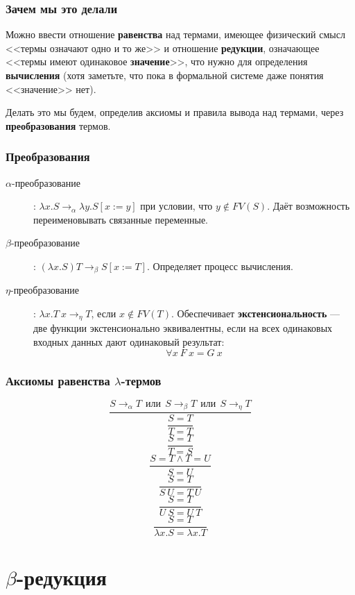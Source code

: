 \documentclass{../../slides-style}
\begin{document}
    \begin{frame}
        \frametitle{Зачем мы это делали}
        Можно ввести отношение \textbf{равенства} над термами, имеющее физический смысл 
        <<термы означают одно и то же>> и отношение \textbf{редукции}, означающее <<термы имеют 
        одинаковое \textbf{значение}>>, что нужно для определения \textbf{вычисления} (хотя заметьте, что пока в
        формальной системе даже понятия <<значение>> нет).
        
        Делать это мы будем, определив аксиомы и правила вывода над термами, через \textbf{преобразования}
        термов.
    \end{frame}
        
    \begin{frame}
        \frametitle{Преобразования}
        \begin{description}
            \item [$\alpha$-преобразование]: $\lambda x.S \rightarrow_\alpha 
                    \lambda y.S[x := y]$ при условии, что $y \notin FV(S)$. 
                    Даёт возможность переименовывать связанные переменные.
            \item [$\beta$-преобразование]: $(\lambda x.S) T \rightarrow_\beta S[x := T]$.
                    Определяет процесс вычисления.
            \item [$\eta$-преобразование]: $\lambda x.T\ x \rightarrow_\eta T$, 
                    если $x \notin FV(T)$. Обеспечивает	\textbf{экстенсиональность} 
                    --- две функции экстенсионально эквивалентны, если на всех
                    одинаковых входных данных дают одинаковый результат:
                    $$\forall x\ F\ x = G\ x$$
        \end{description}
    \end{frame}

    \begin{frame}
        \frametitle{Аксиомы равенства $\lambda$-термов}
        $$\dfrac{S \rightarrow_\alpha T\ \ 
            \mbox{или}\ \ S \rightarrow_\beta T\ \ 
            \mbox{или}\ \  S \rightarrow_\eta T}{S = T}$$
        $$\dfrac{}{T = T}$$
        $$\dfrac{S = T}{T = S}$$
        $$\dfrac{S = T \wedge T = U}{S = U}$$
        $$\dfrac{S = T}{S\ U = T\ U}$$
        $$\dfrac{S = T}{U\ S = U\ T}$$
        $$\dfrac{S = T}{\lambda x.S = \lambda x.T}$$
    \end{frame}
    
    \section{$\beta$-редукция}
\end{document}
